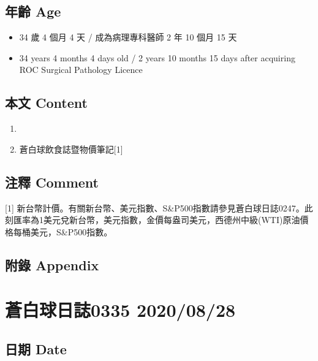 \documentclass[
]{article}
\providecommand{\tightlist}{%
  \setlength{\itemsep}{0pt}\setlength{\parskip}{0pt}}
\begin{document}
\hypertarget{ux5e74ux9f61-age-26}{%
\subsection{年齡 Age}\label{ux5e74ux9f61-age-26}}

\begin{itemize}
\tightlist
\item
  34 歲 4 個月 4 天 / 成為病理專科醫師 2 年 10 個月 15 天
\item
  34 years 4 months 4 days old / 2 years 10 months 15 days after
  acquiring ROC Surgical Pathology Licence
\end{itemize}

\hypertarget{ux672cux6587-content-26}{%
\subsection{本文 Content}\label{ux672cux6587-content-26}}

\begin{enumerate}
\def\labelenumi{\arabic{enumi}.}
\tightlist
\item
\item
  蒼白球飲食誌暨物價筆記{[}1{]}
\end{enumerate}

\hypertarget{ux6ce8ux91cb-comment-26}{%
\subsection{注釋 Comment}\label{ux6ce8ux91cb-comment-26}}

{[}1{]}
新台幣計價。有關新台幣、美元指數、S\&P500指數請參見蒼白球日誌0247。此刻匯率為1美元兌新台幣，美元指數，金價每盎司美元，西德州中級(WTI)原油價格每桶美元，S\&P500指數。

\hypertarget{ux9644ux9304-appendix-26}{%
\subsection{附錄 Appendix}\label{ux9644ux9304-appendix-26}}

\hypertarget{ux84bcux767dux7403ux65e5ux8a8c0335-20200828}{%
\section{蒼白球日誌0335
2020/08/28}\label{ux84bcux767dux7403ux65e5ux8a8c0335-20200828}}

\hypertarget{ux65e5ux671f-date-27}{%
\subsection{日期 Date}\label{ux65e5ux671f-date-27}}
\end{document}
